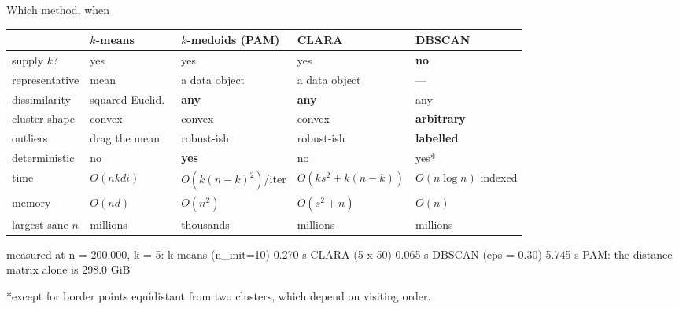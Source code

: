 \documentclass[aspectratio=169]{beamer}
\begin{document}
\begin{frame}[fragile,shrink=10]{Which method, when}
  \begin{center}\small
  \begin{tabular}{lllll}
    \toprule
     & $k$-means & $k$-medoids (PAM) & CLARA & DBSCAN \\
    \midrule
    supply $k$?        & yes & yes & yes & \textbf{no} \\
    representative     & mean & a data object & a data object & --- \\
    dissimilarity      & squared Euclid.\ & \textbf{any} & \textbf{any} & any \\
    cluster shape      & convex & convex & convex & \textbf{arbitrary} \\
    outliers           & drag the mean & robust-ish & robust-ish
                       & \textbf{labelled} \\
    deterministic      & no & \textbf{yes} & no & yes\footnotesize{*} \\
    time               & $O(nkdi)$ & $O(k(n{-}k)^2)$/iter
                       & $O(ks^2 + k(n{-}k))$ & $O(n\log n)$ indexed \\
    memory             & $O(nd)$ & $O(n^2)$ & $O(s^2 + n)$ & $O(n)$ \\
    largest sane $n$   & millions & thousands & millions & millions \\
    \bottomrule
  \end{tabular}
  \end{center}
  \vspace{0.2em}
\begin{outblk}
  measured at n = 200,000, k = 5:
    k-means (n_init=10)  0.270 s      CLARA (5 x 50)   0.065 s
    DBSCAN (eps = 0.30)  5.745 s      PAM: the distance matrix alone is 298.0 GiB
\end{outblk}
  \begin{center}\scriptsize
    *except for border points equidistant from two clusters, which depend on
    visiting order.
  \end{center}
\end{frame}
\end{document}
